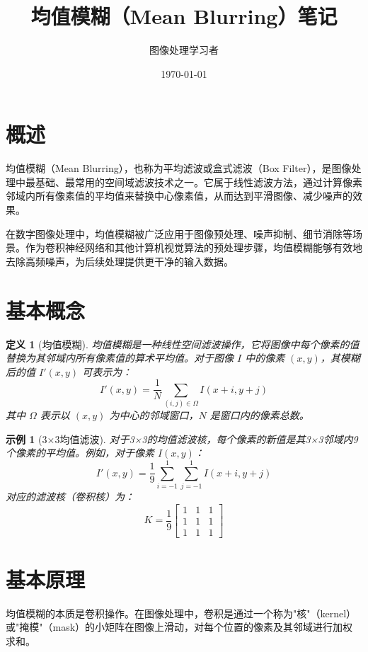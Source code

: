 \documentclass{article}
\title{\textbf{均值模糊（Mean Blurring）笔记}}
\author{图像处理学习者}
\date{\today}
\newtheorem{definition}{定义}[section]
\newtheorem{example}{示例}[section]
\begin{document}
\maketitle

\tableofcontents
\newpage

\section{概述}
均值模糊（Mean Blurring），也称为平均滤波或盒式滤波（Box Filter），是图像处理中最基础、最常用的空间域滤波技术之一。它属于线性滤波方法，通过计算像素邻域内所有像素值的平均值来替换中心像素值，从而达到平滑图像、减少噪声的效果。

在数字图像处理中，均值模糊被广泛应用于图像预处理、噪声抑制、细节消除等场景。作为卷积神经网络和其他计算机视觉算法的预处理步骤，均值模糊能够有效地去除高频噪声，为后续处理提供更干净的输入数据。

\section{基本概念}

\begin{definition}[均值模糊]
均值模糊是一种线性空间滤波操作，它将图像中每个像素的值替换为其邻域内所有像素值的算术平均值。对于图像 $I$ 中的像素 $(x,y)$，其模糊后的值 $I'(x,y)$ 可表示为：
\[
I'(x,y) = \frac{1}{N} \sum_{(i,j) \in \Omega} I(x+i, y+j)
\]
其中 $\Omega$ 表示以 $(x,y)$ 为中心的邻域窗口，$N$ 是窗口内的像素总数。
\end{definition}

\begin{example}[3×3均值滤波]
对于3×3的均值滤波核，每个像素的新值是其3×3邻域内9个像素的平均值。例如，对于像素 $I(x,y)$：
\[
I'(x,y) = \frac{1}{9} \sum_{i=-1}^{1} \sum_{j=-1}^{1} I(x+i, y+j)
\]
对应的滤波核（卷积核）为：
\[
K = \frac{1}{9} \begin{bmatrix}
1 & 1 & 1 \\
1 & 1 & 1 \\
1 & 1 & 1
\end{bmatrix}
\]
\end{example}

\section{基本原理}

均值模糊的本质是卷积操作。在图像处理中，卷积是通过一个称为"核"（kernel）或"掩模"（mask）的小矩阵在图像上滑动，对每个位置的像素及其邻域进行加权求和。
\end{document}
